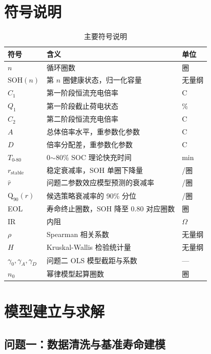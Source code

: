 \documentclass[12pt,a4paper]{article}
\begin{document}
\section{符号说明}

\begin{table}[H]
\centering
\caption{主要符号说明}
\label{tab:symbols}
\small
\begin{tabular}{lll}
\toprule
符号 & 含义 & 单位 \\
\midrule
$n$ & 循环圈数 & 圈 \\
$\mathrm{SOH}(n)$ & 第 $n$ 圈健康状态，归一化容量 & 无量纲 \\
$C_1$ & 第一阶段恒流充电倍率 & C \\
$Q_1$ & 第一阶段截止荷电状态 & \% \\
$C_2$ & 第二阶段恒流充电倍率 & C \\
$A$ & 总体倍率水平，重参数化参数 & C \\
$D$ & 倍率分配差，重参数化参数 & C \\
$T_{0\text{-}80}$ & 0$\sim$80\% SOC 理论快充时间 & min \\
$r_\text{stable}$ & 稳定衰减率，SOH 单圈下降量 & /圈 \\
$\hat{r}$ & 问题二参数效应模型预测的衰减率 & /圈 \\
$\mathrm{Q}_{90}(r)$ & 候选策略衰减率的 90\% 分位 & /圈 \\
EOL & 寿命终止圈数，SOH 降至 0.80 对应圈数 & 圈 \\
IR & 内阻 & $\Omega$ \\
$\rho$ & Spearman 相关系数 & 无量纲 \\
$H$ & Kruskal-Wallis 检验统计量 & 无量纲 \\
$\gamma_0,\gamma_A,\gamma_D$ & 问题二 OLS 模型截距与系数 & --- \\
$n_0$ & 幂律模型起算圈数 & 圈 \\
\bottomrule
\end{tabular}
\end{table}

\section{模型建立与求解}

\subsection{问题一：数据清洗与基准寿命建模}
\end{document}
